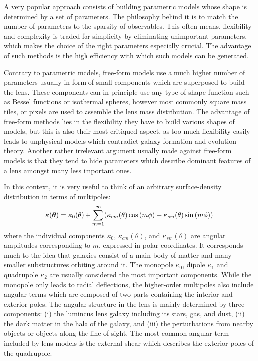A very popular approach consists of building parametric models whose shape is
determined by a set of parameters.  The philosophy behind it is to match the
number of parameters to the sparsity of observables.  This often means,
flexibility and complexity is traded for simplicity by eliminating unimportant
parameters, which makes the choice of the right parameters especially crucial.
The advantage of such methods is the high efficiency with which such models can
be generated.  

Contrary to parametric models, free-form models use a much higher number of
parameters usually in form of small components which are superposed to build the
lens.  These components can in principle use any type of shape function such as
Bessel functions or isothermal spheres, however most commonly square mass tiles,
or pixels are used to assemble the lens mass distribution.  The advantage of
free-form methods lies in the flexibility they have to build various shapes of
models, but this is also their most critiqued aspect, as too much flexibility
easily leads to unphysical models which contradict galaxy formation and
evolution theory.  Another rather irrelevant argument usually made against
free-form models is that they tend to hide parameters which describe dominant
features of a lens amongst many less important ones.  

In this context, it is very useful to think of an arbitrary surface-density
distribution in terms of multipoles:
%
\begin{equation}\eqlbl{match:multipoles}%
  \kappa(\bm\theta) = \kappa_0(\theta) + \sum^{\infty}_{m=1} (\kappa_{cm}(\theta)\cos{(m\phi)} + \kappa_{sm}(\theta)\sin{(m\phi)})
\end{equation}%
%
where the individual components $\kappa_{0}$, $\kappa_{cm}(\theta)$, and $\kappa_{sm}(\theta)$ are
angular amplitudes corresponding to $m$, expressed in polar coordinates.  It
corresponds much to the idea that galaxies consist of a main body of matter and
many smaller substructures orbiting around it.  The monopole $\kappa_0$, dipole
$\kappa_1$ and quadrupole $\kappa_2$ are usually considered the most important
components.  While the monopole only leads to radial deflections, the
higher-order multipoles also include angular terms which are composed of two
parts containing the interior and exterior poles.  The angular structure in the
lens is mainly determined by three components: (i) the luminous lens galaxy
including its stars, gas, and dust, (ii) the dark matter in the halo of the
galaxy, and (iii) the perturbations from nearby objects or objects along the
line of sight.  The most common angular term included by lens models is the
external shear which describes the exterior poles of the quadrupole.

